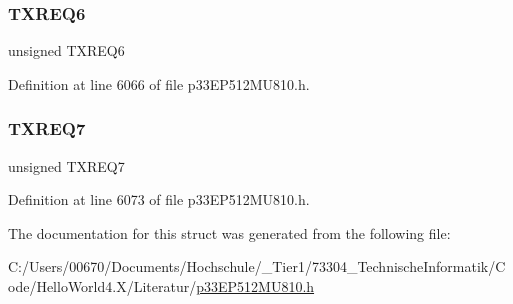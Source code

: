\mbox{\label{structtag_c2_t_r67_c_o_n_b_i_t_s_a2c5aa76d2ac34727d2c3b1242fde4597}} 
\subsubsection{\texorpdfstring{T\+X\+R\+E\+Q6}{TXREQ6}}
{\footnotesize\ttfamily unsigned T\+X\+R\+E\+Q6}



Definition at line 6066 of file p33\+E\+P512\+M\+U810.\+h.

\mbox{\label{structtag_c2_t_r67_c_o_n_b_i_t_s_a787fc1af7ad34091400347d5ff70bd22}} 
\subsubsection{\texorpdfstring{T\+X\+R\+E\+Q7}{TXREQ7}}
{\footnotesize\ttfamily unsigned T\+X\+R\+E\+Q7}



Definition at line 6073 of file p33\+E\+P512\+M\+U810.\+h.



The documentation for this struct was generated from the following file\+:\begin{DoxyCompactItemize}
\item 
C\+:/\+Users/00670/\+Documents/\+Hochschule/\+\_\+\+Tier1/73304\+\_\+\+Technische\+Informatik/\+Code/\+Hello\+World4.\+X/\+Literatur/\hyperlink{p33_e_p512_m_u810_8h}{p33\+E\+P512\+M\+U810.\+h}\end{DoxyCompactItemize}
